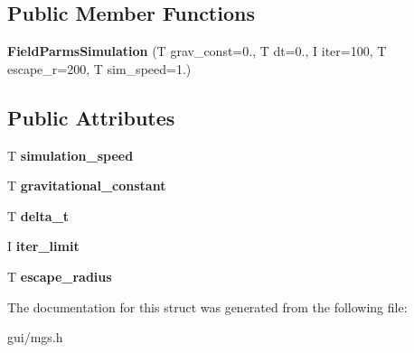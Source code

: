 \subsection*{Public Member Functions}
\begin{DoxyCompactItemize}
\item 
\mbox{\label{structmgs_1_1FieldParmsSimulation_a47d6dbd94d7ade70daf013088942d0eb}} 
{\bfseries Field\+Parms\+Simulation} (T grav\+\_\+const=0., T dt=0., I iter=100, T escape\+\_\+r=200, T sim\+\_\+speed=1.)
\end{DoxyCompactItemize}
\subsection*{Public Attributes}
\begin{DoxyCompactItemize}
\item 
\mbox{\label{structmgs_1_1FieldParmsSimulation_a947176fc1d7d4b5aaf929616f1bd3a24}} 
T {\bfseries simulation\+\_\+speed}
\item 
\mbox{\label{structmgs_1_1FieldParms_ac087d3d0e4e9d1aa8e9290610327d7f9}} 
T {\bfseries gravitational\+\_\+constant}
\item 
\mbox{\label{structmgs_1_1FieldParms_a46eea5527c0fd40eadcd377dd5b8d97d}} 
T {\bfseries delta\+\_\+t}
\item 
\mbox{\label{structmgs_1_1FieldParms_a4ad3c8d11a2f695b89bccbc02d1cb0c5}} 
I {\bfseries iter\+\_\+limit}
\item 
\mbox{\label{structmgs_1_1FieldParms_ab28959482fd11ba2eb1e37f842d26e8a}} 
T {\bfseries escape\+\_\+radius}
\end{DoxyCompactItemize}


The documentation for this struct was generated from the following file\+:\begin{DoxyCompactItemize}
\item 
gui/mgs.\+h\end{DoxyCompactItemize}
